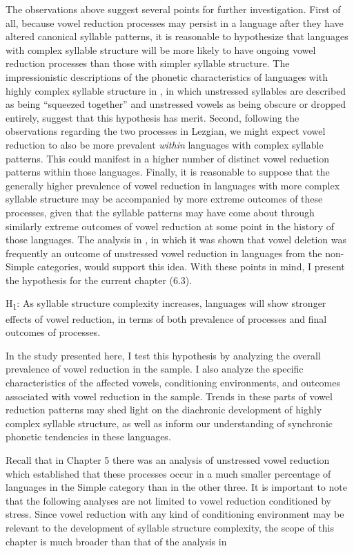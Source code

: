   The observations above suggest several points for further investigation. First of all, because vowel reduction processes may persist in a language after they have altered canonical syllable patterns, it is reasonable to hypothesize that languages with complex syllable structure will be more likely to have ongoing vowel reduction processes than those with simpler syllable structure. The impressionistic descriptions of the phonetic characteristics of languages with highly complex syllable structure in , in which unstressed syllables are described as being “squeezed together” and unstressed vowels as being obscure or dropped entirely, suggest that this hypothesis has merit. Second, following the observations regarding the two processes in Lezgian, we might expect vowel reduction to also be more prevalent \textit{within} languages with complex syllable patterns. This could manifest in a higher number of distinct vowel reduction patterns within those languages. Finally, it is reasonable to suppose that the generally higher prevalence of vowel reduction in languages with more complex syllable structure may be accompanied by more extreme outcomes of these processes, given that the syllable patterns may have come about through similarly extreme outcomes of vowel reduction at some point in the history of those languages. The analysis in , in which it was shown that vowel deletion was frequently an outcome of unstressed vowel reduction in languages from the non-Simple categories, would support this idea. With these points in mind, I present the hypothesis for the current chapter (6.3).

\ea\label{ex:(6.3)}
   H\textsubscript{1}:  As syllable structure complexity increases, languages will show stronger effects of vowel reduction, in terms of both prevalence of processes and final outcomes of processes.

\z

  In the study presented here, I test this hypothesis by analyzing the overall prevalence of vowel reduction in the sample. I also analyze the specific characteristics of the affected vowels, conditioning environments, and outcomes associated with vowel reduction in the sample. Trends in these parts of vowel reduction patterns may shed light on the diachronic development of highly complex syllable structure, as well as inform our understanding of synchronic phonetic tendencies in these languages.

  Recall that in Chapter 5 there was an analysis of unstressed vowel reduction which established that these processes occur in a much smaller percentage of languages in the Simple category than in the other three. It is important to note that the following analyses are not limited to vowel reduction conditioned by stress. Since vowel reduction with any kind of conditioning environment may be relevant to the development of syllable structure complexity, the scope of this chapter is much broader than that of the analysis in 

